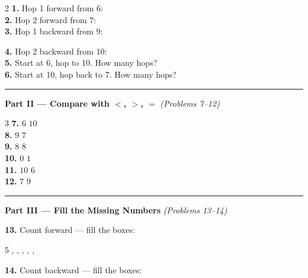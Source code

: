 \documentclass[12pt, letterpaper]{article}
\newcommand{\answerline}{\underline{\hspace{2.5cm}}}
\newcommand{\numbox}{\fbox{\hspace{0.6cm}\vphantom{0}}}
\newcommand{\symbox}{\fbox{\hspace{0.7cm}}}
\begin{document}
\bigskip
\begin{multicols}{2}
\noindent\textbf{1.} Hop 1 forward from 6: \hfill \answerline \\[12pt]
\noindent\textbf{2.} Hop 2 forward from 7: \hfill \answerline \\[12pt]
\noindent\textbf{3.} Hop 1 backward from 9: \hfill \answerline

\columnbreak

\noindent\textbf{4.} Hop 2 backward from 10: \hfill \answerline \\[12pt]
\noindent\textbf{5.} Start at 6, hop to 10. How many hops? \hfill \answerline \\[12pt]
\noindent\textbf{6.} Start at 10, hop back to 7. How many hops? \hfill \answerline
\end{multicols}

\bigskip
\noindent\textcolor{scholared}{\rule{\linewidth}{0.4pt}}

\noindent\textcolor{scholared}{\large\textbf{Part II — Compare with $<$, $>$, $=$}} \hfill \textit{(Problems 7–12)}

\bigskip
\begin{multicols}{3}
\noindent\textbf{7.} $6$ \; \symbox \; $10$ \\[14pt]
\noindent\textbf{8.} $9$ \; \symbox \; $7$ \\

\columnbreak
\noindent\textbf{9.} $8$ \; \symbox \; $8$ \\[14pt]
\noindent\textbf{10.} $0$ \; \symbox \; $1$ \\

\columnbreak
\noindent\textbf{11.} $10$ \; \symbox \; $6$ \\[14pt]
\noindent\textbf{12.} $7$ \; \symbox \; $9$
\end{multicols}

\bigskip
\noindent\textcolor{scholared}{\rule{\linewidth}{0.4pt}}

\noindent\textcolor{scholared}{\large\textbf{Part III — Fill the Missing Numbers}} \hfill \textit{(Problems 13–14)}

\bigskip
\noindent\textbf{13.} Count forward — fill the boxes:

\medskip
\hspace{2em} 5 \; , \; \numbox \; , \; \numbox \; ,  \; , \; \numbox \; , 

\bigskip
\noindent\textbf{14.} Count backward — fill the boxes:
\end{document}
